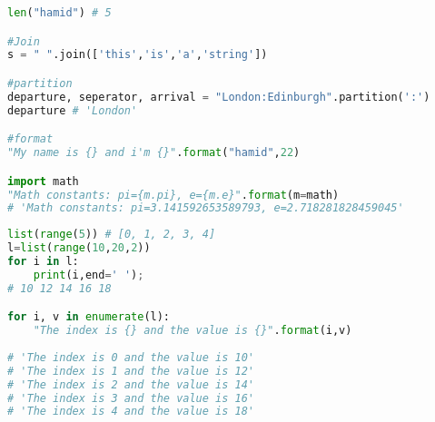 \begin{note}
\begin{lstlisting}[language = {python}]
len("hamid") # 5

#Join
s = " ".join(['this','is','a','string'])

#partition
departure, seperator, arrival = "London:Edinburgh".partition(':')
departure # 'London'

#format
"My name is {} and i'm {}".format("hamid",22)

import math
"Math constants: pi={m.pi}, e={m.e}".format(m=math)
# 'Math constants: pi=3.141592653589793, e=2.718281828459045'
\end{lstlisting}
\end{note}
\begin{note}[Range]
\begin{lstlisting}[language = {python}]
list(range(5)) # [0, 1, 2, 3, 4]
l=list(range(10,20,2))
for i in l:
    print(i,end=' ');
# 10 12 14 16 18 

for i, v in enumerate(l):
    "The index is {} and the value is {}".format(i,v)
    
# 'The index is 0 and the value is 10'
# 'The index is 1 and the value is 12'
# 'The index is 2 and the value is 14'
# 'The index is 3 and the value is 16'
# 'The index is 4 and the value is 18'
\end{lstlisting}
\end{note}

